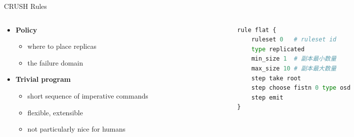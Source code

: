 \begin{frame}[fragile]{CRUSH Rules}
    \begin{columns}
        \begin{column}{0.6\textwidth}
            \begin{itemize}
                \item \textbf{Policy}
                    \begin{itemize}
                        \item where to place replicas
                        \item the failure domain
                    \end{itemize}
                \item \textbf{Trivial program}
                    \begin{itemize}
                        \item short sequence of imperative commands
                        \item flexible, extensible
                        \item not particularly nice for humans
                    \end{itemize}
            \end{itemize} 
        \end{column}
        \begin{column}{0.4\textwidth}
\begin{lstlisting}[language=python]
rule flat {
    ruleset 0   # ruleset id
    type replicated
    min_size 1  # 副本最小数量
    max_size 10 # 副本最大数量
    step take root
    step choose fistn 0 type osd
    step emit
}
\end{lstlisting}
       \end{column}
   \end{columns} 
\end{frame}

